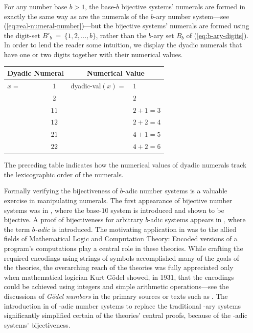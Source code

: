 For any number base $b > 1$, the base-$b$ bijective systems' numerals
are formed in exactly the same way as are the numerals of the $b$-ary
number system---see (\ref{eq:real-numeral-number})---but the bijective
systems' numerals are formed using the digit-set $B'_b \ = \ \{1, 2,
\ldots, b\}$, rather than the $b$-ary set $B_b$ of
(\ref{eq:b-ary-digits}).  In order to lend the reader some intuition,
we display the dyadic numerals that have one or two digits together
with their numerical values.

\smallskip

\begin{tabular}{|lc|ll|}
\hline
\multicolumn{2}{c}{\bf Dyadic Numeral} & \multicolumn{2}{c}{\bf Numerical Value} \\
\hline
$x=$ & $1$  & {\sc dyadic-val}$(x) =$ & $1$ \\
     & $2$  &                         & $2$ \\
     & $11$ &                         & $2 + 1 = 3$ \\
     & $12$ &                         & $2 + 2 = 4$ \\
     & $21$ &                         & $4 + 1 = 5$ \\
     & $22$ &                         & $4 + 2 = 6$ \\
\hline
\end{tabular}

\medskip
\noindent
The preceding table indicates how the numerical values of dyadic
numerals track the lexicographic order of the numerals.

\bigskip

Formally verifying the bijectiveness of $b$-adic number systems is a
valuable exercise in manipulating numerals.  The first appearance of
bijective number systems was in \cite{Foster47}, where the base-$10$
system is introduced and shown to be bijective.  A proof of
bijectiveness for arbitrary $b$-adic systems appears in
\cite{Smullyan61}, where the term {\em $b$-adic} is introduced.  The
motivating application in \cite{Smullyan61} was to the allied fields
of Mathematical Logic and Computation Theory: Encoded versions of a
program's computations play a central role in these theories.  While
crafting the required encodings using strings of symbols accomplished
many of the goals of the theories, the overarching reach of the
theories was fully appreciated only when mathematical logician Kurt
G\"{o}del  showed, in 1931, that the encodings
could be achieved using integers and simple arithmetic
operations---see the discussions of {\it G\"{o}del numbers}
 in the primary sources
\cite{Goedel31,Turing36} or texts such as \cite{Rosenberg12}.  The
introduction in \cite{Smullyan61} of -adic number systems to replace
the traditional -ary systems significantly simplified certain of the
theories' central proofs, because of the -adic systems' bijectiveness.

